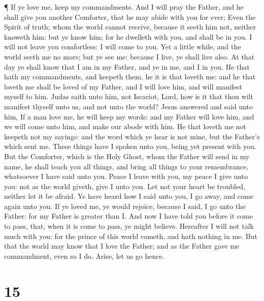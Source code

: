  ¶ If ye love me, keep my commandments.  And I
will pray the Father, and he shall give you another Comforter, that he
may abide with you for ever;  Even the Spirit of truth;
whom the world cannot receive, because it seeth him not, neither knoweth
him: but ye know him; for he dwelleth with you, and shall be in you.
 I will not leave you comfortless: I will come to you.
 Yet a little while, and the world seeth me no more; but ye
see me: because I live, ye shall live also.  At that day ye
shall know that I am in my Father, and ye in me, and I in you.
 He that hath my commandments, and keepeth them, he it is
that loveth me: and he that loveth me shall be loved of my Father, and I
will love him, and will manifest myself to him.  Judas
saith unto him, not Iscariot, Lord, how is it that thou wilt manifest
thyself unto us, and not unto the world?  Jesus answered
and said unto him, If a man love me, he will keep my words: and my
Father will love him, and we will come unto him, and make our abode with
him.  He that loveth me not keepeth not my sayings: and the
word which ye hear is not mine, but the Father's which sent me.
 These things have I spoken unto you, being yet present
with you.  But the Comforter, which is the Holy Ghost, whom
the Father will send in my name, he shall teach you all things, and
bring all things to your remembrance, whatsoever I have said unto you.
 Peace I leave with you, my peace I give unto you: not as
the world giveth, give I unto you. Let not your heart be troubled,
neither let it be afraid.  Ye have heard how I said unto
you, I go away, and come again unto you. If ye loved me, ye would
rejoice, because I said, I go unto the Father: for my Father is greater
than I.  And now I have told you before it come to pass,
that, when it is come to pass, ye might believe.  Hereafter
I will not talk much with you: for the prince of this world cometh, and
hath nothing in me.  But that the world may know that I
love the Father; and as the Father gave me commandment, even so I do.
Arise, let us go hence.

\hypertarget{section-14}{%
\section{15}\label{section-14}}

